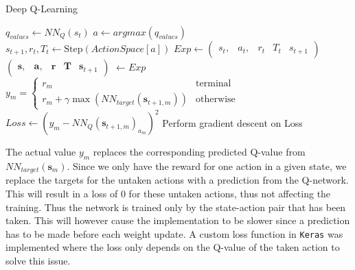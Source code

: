 \documentclass[final]{LTHtwocol} %
\begin{document}
\begin{algorithm}[htp]
	\label{alg:deep_q_training}
	\caption{Deep Q-Learning}
	\begin{algorithmic}
			 
				\State $q_{values} \gets NN_Q(s_t)$  %
				\State $a \gets argmax(q_{values})$ 	 
				\State $s_{t+1}, r_t, T_t \gets \text{Step}(ActionSpace[a])$ %
				\State $Exp \gets \begin{pmatrix} s_t, & a_t, & r_t & T_t & s_{t+1} \end{pmatrix}$
				\State $\begin{pmatrix} \mathbf{s}, & \mathbf{a}, & \mathbf{r} & \mathbf{T} & \mathbf{s}_{t+1} \end{pmatrix}$ $\gets Exp$  
				\State $y_m = \begin{cases} r_m & \text{terminal} \\ r_m + \gamma \max ( NN_{target}(\mathbf{s}_{t+1, m}) ) & \text{otherwise} \end{cases}$
				\State  $Loss \gets (y_m - NN_Q(\mathbf{s}_{t+1,m})_{a_m})^2$
				\State Perform gradient descent on Loss
			\EndWhile
		\EndFor
	\end{algorithmic}
\end{algorithm}
The actual value $y_m$ replaces the corresponding predicted Q-value from $NN_{target}(\mathbf{s}_m)$.
Since we only have the reward for one action in a given state, we replace the targets for the untaken actions with a prediction from the Q-network.
This will result in a loss of 0 for these untaken actions, thus not affecting the training.
Thus the network is trained only by the state-action pair that has been taken.
This will however cause the implementation to be slower since a prediction has to be made before each weight update.
A custom loss function in \texttt{Keras} was implemented where the loss only depends on the Q-value of the taken action to solve this issue.
\end{document}
